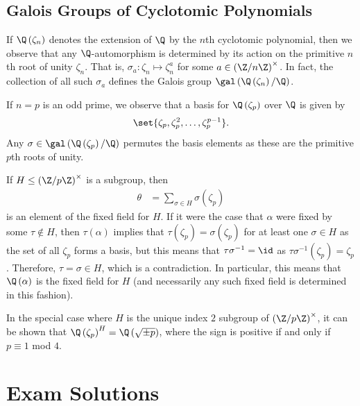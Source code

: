 \documentclass[10pt]{mypackage}
\begin{document}
\subsection{Galois Groups of Cyclotomic Polynomials}%
If $\Q\left( \zeta_n \right)$ denotes the extension of $\Q$ by the $n$th cyclotomic polynomial, then we observe that any $\Q$-automorphism is determined by its action on the primitive $n$th root of unity $\zeta_n$. That is, $\sigma_a\colon \zeta_n\mapsto \zeta_n^{a}$ for some $a\in \left( \Z/n\Z \right)^{\times}$. In fact, the collection of all such $\sigma_a$ defines the Galois group $\gal\left( \Q\left( \zeta_n \right)/\Q \right)$.

If $n = p$ is an odd prime, we observe that a basis for $\Q\left( \zeta_p \right)$ over $\Q$ is given by
\begin{align*}
  \set{\zeta_p,\zeta_p^2,\dots,\zeta_p^{p-1}}.
\end{align*}
Any $\sigma\in\gal\left( \Q\left( \zeta_p \right)/\Q \right)$ permutes the basis elements as these are the primitive $p$th roots of unity.

If $H\leq \left( \Z/p\Z \right)^{\times}$ is a subgroup, then
\begin{align*}
  \theta &= \sum_{\sigma\in H} \sigma\left( \zeta_p \right)
\end{align*}
is an element of the fixed field for $H$. If it were the case that $\alpha$ were fixed by some $\tau\notin H$, then $\tau\left( \alpha \right)$ implies that $\tau\left( \zeta_p \right) = \sigma\left( \zeta_p \right)$ for at least one $\sigma\in H$ as the set of all $\zeta_p$ forms a basis, but this means that $\tau\sigma^{-1} = \id$ as $\tau\sigma^{-1}\left(\zeta_p\right) = \zeta_p$. Therefore, $\tau = \sigma\in H$, which is a contradiction. In particular, this means that $\Q\left( \alpha \right)$ is the fixed field for $H$ (and necessarily any such fixed field is determined in this fashion).

In the special case where $H$ is the unique index $2$ subgroup of $\left( \Z/p\Z \right)^{\times}$, it can be shown that $\Q\left( \zeta_p \right)^{H} = \Q\left( \sqrt{\pm p} \right)$, where the sign is positive if and only if $p\equiv 1$ mod $4$.
\section{Exam Solutions}%
\end{document}
